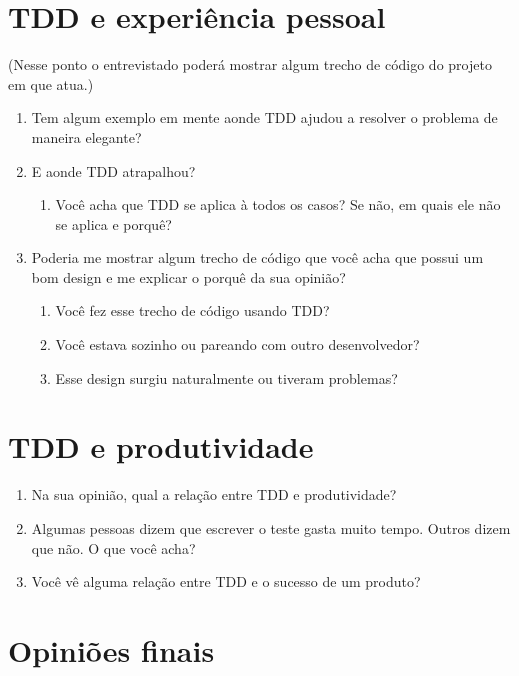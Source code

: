 \section{TDD e experiência pessoal}

(Nesse ponto o entrevistado poderá mostrar algum trecho de código do projeto em que atua.)

\begin{enumerate}
	\item Tem algum exemplo em mente aonde TDD ajudou a resolver o problema de maneira elegante?
	\item E aonde TDD atrapalhou?
		\begin{enumerate}
			\item Você acha que TDD se aplica à todos os casos? Se não, em quais ele não se aplica e porquê?
		\end{enumerate}
	\item Poderia me mostrar algum trecho de código que você acha que possui um bom design e me explicar o porquê da sua opinião?
		\begin{enumerate}
			\item Você fez esse trecho de código usando TDD?
			\item Você estava sozinho ou pareando com outro desenvolvedor?
			\item Esse design surgiu naturalmente ou tiveram problemas?
		\end{enumerate}
\end{enumerate}

\section{TDD e produtividade}
\begin{enumerate}
	\item Na sua opinião, qual a relação entre TDD e produtividade?
	\item Algumas pessoas dizem que escrever o teste gasta muito tempo. Outros dizem que não. O que você acha?
	\item Você vê alguma relação entre TDD e o sucesso de um produto?
\end{enumerate}

\section{Opiniões finais}

